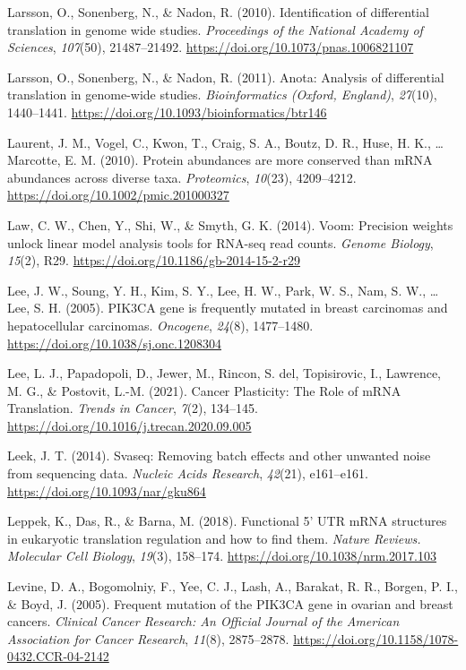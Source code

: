 \documentclass[12pt,openany]{book}
\begin{document}
\hypertarget{ref-Larsson2010}{}
Larsson, O., Sonenberg, N., \& Nadon, R. (2010). Identification of
differential translation in genome wide studies. \emph{Proceedings of
the National Academy of Sciences}, \emph{107}(50), 21487--21492.
\url{https://doi.org/10.1073/pnas.1006821107}

\hypertarget{ref-Larsson2011}{}
Larsson, O., Sonenberg, N., \& Nadon, R. (2011). Anota: Analysis of
differential translation in genome-wide studies. \emph{Bioinformatics
(Oxford, England)}, \emph{27}(10), 1440--1441.
\url{https://doi.org/10.1093/bioinformatics/btr146}

\hypertarget{ref-Laurent2010}{}
Laurent, J. M., Vogel, C., Kwon, T., Craig, S. A., Boutz, D. R., Huse,
H. K., \ldots{} Marcotte, E. M. (2010). Protein abundances are more
conserved than mRNA abundances across diverse taxa. \emph{Proteomics},
\emph{10}(23), 4209--4212. \url{https://doi.org/10.1002/pmic.201000327}

\hypertarget{ref-Law2014}{}
Law, C. W., Chen, Y., Shi, W., \& Smyth, G. K. (2014). Voom: Precision
weights unlock linear model analysis tools for RNA-seq read counts.
\emph{Genome Biology}, \emph{15}(2), R29.
\url{https://doi.org/10.1186/gb-2014-15-2-r29}

\hypertarget{ref-Lee2005}{}
Lee, J. W., Soung, Y. H., Kim, S. Y., Lee, H. W., Park, W. S., Nam, S.
W., \ldots{} Lee, S. H. (2005). PIK3CA gene is frequently mutated in
breast carcinomas and hepatocellular carcinomas. \emph{Oncogene},
\emph{24}(8), 1477--1480. \url{https://doi.org/10.1038/sj.onc.1208304}

\hypertarget{ref-Lee2021}{}
Lee, L. J., Papadopoli, D., Jewer, M., Rincon, S. del, Topisirovic, I.,
Lawrence, M. G., \& Postovit, L.-M. (2021). Cancer Plasticity: The Role
of mRNA Translation. \emph{Trends in Cancer}, \emph{7}(2), 134--145.
\url{https://doi.org/10.1016/j.trecan.2020.09.005}

\hypertarget{ref-Leek2014}{}
Leek, J. T. (2014). Svaseq: Removing batch effects and other unwanted
noise from sequencing data. \emph{Nucleic Acids Research},
\emph{42}(21), e161--e161. \url{https://doi.org/10.1093/nar/gku864}

\hypertarget{ref-Leppek2018}{}
Leppek, K., Das, R., \& Barna, M. (2018). Functional 5' UTR mRNA
structures in eukaryotic translation regulation and how to find them.
\emph{Nature Reviews. Molecular Cell Biology}, \emph{19}(3), 158--174.
\url{https://doi.org/10.1038/nrm.2017.103}

\hypertarget{ref-Levine2005}{}
Levine, D. A., Bogomolniy, F., Yee, C. J., Lash, A., Barakat, R. R.,
Borgen, P. I., \& Boyd, J. (2005). Frequent mutation of the PIK3CA gene
in ovarian and breast cancers. \emph{Clinical Cancer Research: An
Official Journal of the American Association for Cancer Research},
\emph{11}(8), 2875--2878.
\url{https://doi.org/10.1158/1078-0432.CCR-04-2142}
\end{document}
